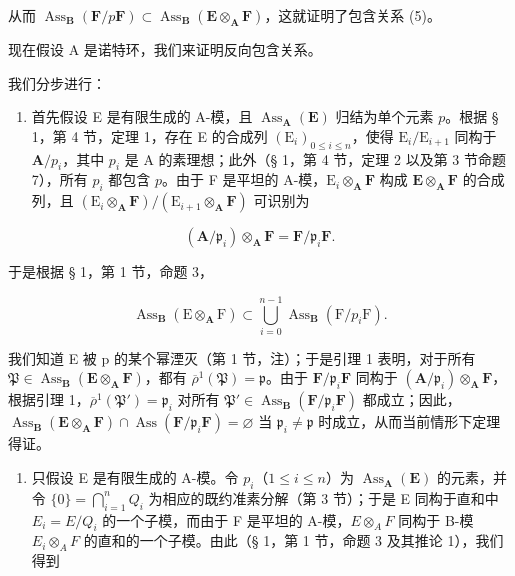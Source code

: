 从而 \(\operatorname{Ass}_{\mathbf{B}}(\mathbf{F} / p\mathbf{F})\subset \operatorname{Ass}_{\mathbf{B}}(\mathbf{E}\otimes_{\mathbf{A}}\mathbf{F})\)，这就证明了包含关系 (5)。

现在假设 A 是诺特环，我们来证明反向包含关系。

我们分步进行：

\begin{enumerate}
\def\labelenumi{(\roman{enumi})}
\tightlist
\item
  首先假设 E 是有限生成的 A-模，且 \(\operatorname{Ass}_{\mathbf{A}}(\mathbf{E})\) 归结为单个元素 \(p\)。根据 § 1，第 4 节，定理 1，存在 E 的合成列 \((\mathrm{E}_i)_{0 \leqslant i \leqslant n}\)，使得 \(\mathrm{E}_i / \mathrm{E}_{i+1}\) 同构于 \(\mathbf{A} / p_i\)，其中 \(p_i\) 是 A 的素理想；此外（§ 1，第 4 节，定理 2 以及第 3 节命题 7），所有 \(p_i\) 都包含 \(p\)。由于 F 是平坦的 A-模，\(\mathrm{E}_i \otimes_{\mathbf{A}} \mathbf{F}\) 构成 \(\mathbf{E} \otimes_{\mathbf{A}} \mathbf{F}\) 的合成列，且 \((\mathrm{E}_i \otimes_{\mathbf{A}} \mathbf{F}) / (\mathrm{E}_{i+1} \otimes_{\mathbf{A}} \mathbf{F})\) 可识别为
\end{enumerate}

\[
(\mathbf {A} / \mathfrak {p} _ {i}) \otimes_ {\mathbf {A}} \mathbf {F} = \mathbf {F} / \mathfrak {p} _ {i} \mathbf {F}.
\]

于是根据 § 1，第 1 节，命题 3，

\[
\operatorname{Ass} _ {\mathbf {B}} (\mathrm{E} \otimes_ {\mathbf {A}} \mathrm{F}) \subset \bigcup_ {i = 0} ^ {n - 1} \operatorname{Ass} _ {\mathbf {B}} (\mathrm{F} / p _ {i} \mathrm{F}).
\]

  我们知道 E 被 p 的某个幂湮灭（第 1 节，注）；于是引理 1 表明，对于所有 \(\mathfrak{P} \in \operatorname{Ass}_{\mathbf{B}}(\mathbf{E} \otimes_{\mathbf{A}} \mathbf{F})\)，都有 \(\overline{\rho}^{1}(\mathfrak{P}) = \mathfrak{p}\)。由于 \(\mathbf{F} / \mathfrak{p}_i \mathbf{F}\) 同构于 \((\mathbf{A} / \mathfrak{p}_i) \otimes_{\mathbf{A}} \mathbf{F}\)，根据引理 1，\(\overline{\rho}^{1}(\mathfrak{P}') = \mathfrak{p}_i\) 对所有 \(\mathfrak{P}' \in \operatorname{Ass}_{\mathbf{B}}(\mathbf{F} / \mathfrak{p}_i \mathbf{F})\) 都成立；因此，\(\operatorname{Ass}_{\mathbf{B}}(\mathbf{E} \otimes_{\mathbf{A}} \mathbf{F}) \cap \operatorname{Ass}(\mathbf{F} / \mathfrak{p}_i \mathbf{F}) = \varnothing\) 当 \(\mathfrak{p}_i \neq \mathfrak{p}\) 时成立，从而当前情形下定理得证。

\begin{enumerate}
\def\labelenumi{(\roman{enumi})}
\setcounter{enumi}{1}
\tightlist
\item
  只假设 E 是有限生成的 A-模。令 \(p_{i}\)（\(1 \leqslant i \leqslant n\)）为 \(\operatorname{Ass}_{\mathbf{A}}(\mathbf{E})\) 的元素，并令 \(\{0\} = \bigcap_{i=1}^{n} Q_{i}\) 为相应的既约准素分解（第 3 节）；于是 E 同构于直和中 \(E_{i} = E/Q_{i}\) 的一个子模，而由于 F 是平坦的 A-模，\(E \otimes_{A} F\) 同构于 B-模 \(E_{i} \otimes_{A} F\) 的直和的一个子模。由此（§ 1，第 1 节，命题 3 及其推论 1），我们得到
\end{enumerate}

